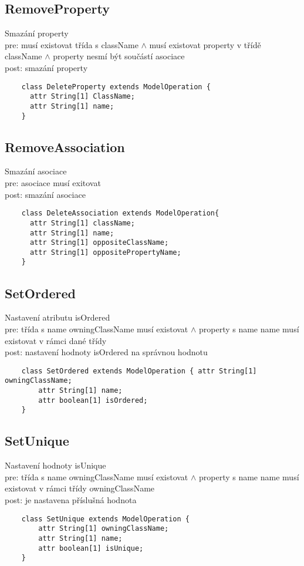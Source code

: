 \documentclass[11pt,a4paper]{article}
\begin{document}
	\subsection{RemoveProperty}
	Smazání property \\
	pre: musí existovat třída s className $\wedge$ musí existovat property v
	třídě className $\wedge$ property nesmí být součástí asociace \\ 
	post: smazání property \\
	\begin{verbatim}
	class DeleteProperty extends ModelOperation {
      attr String[1] ClassName;
      attr String[1] name;
    }
	\end{verbatim}
	
	\subsection{RemoveAssociation}
	Smazání asociace \\
	pre: asociace musí exitovat \\
	post: smazání asociace \\
	
	\begin{verbatim}
    class DeleteAssociation extends ModelOperation{
      attr String[1] className; 
      attr String[1] name;
      attr String[1] oppositeClassName;
      attr String[1] oppositePropertyName; 
    }
	\end{verbatim}
	
	\subsection{SetOrdered}
	Nastavení atributu isOrdered\\
	pre: třída s name owningClassName musí existovat $\wedge$ property s name
	name musí existovat v rámci dané třídy\\
	post: nastavení hodnoty isOrdered na správnou hodnotu\\
	\begin{verbatim}
	class SetOrdered extends ModelOperation { attr String[1] owningClassName;
        attr String[1] name;
        attr boolean[1] isOrdered;
    }
    \end{verbatim}

	\subsection{SetUnique}
	Nastavení hodnoty isUnique\\
	pre: třída s name owningClassName musí existovat $\wedge$ property s name name
	musí existovat v rámci třídy owningClassName\\
	post: je nastavena příslušná hodnota
	\begin{verbatim}
	class SetUnique extends ModelOperation {
        attr String[1] owningClassName;
        attr String[1] name;
        attr boolean[1] isUnique;
    }
    \end{verbatim}
    
\end{document}
